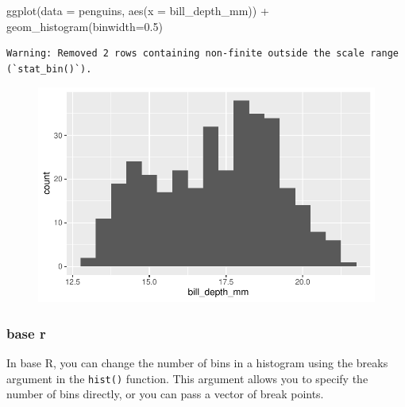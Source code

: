 \documentclass[
  letterpaper,
  DIV=11,
  numbers=noendperiod]{scrreprt}
\newenvironment{Shaded}{\begin{snugshade}}{\end{snugshade}}
\newcommand{\AttributeTok}[1]{\textcolor[rgb]{0.40,0.45,0.13}{#1}}
\newcommand{\FloatTok}[1]{\textcolor[rgb]{0.68,0.00,0.00}{#1}}
\newcommand{\FunctionTok}[1]{\textcolor[rgb]{0.28,0.35,0.67}{#1}}
\newcommand{\NormalTok}[1]{\textcolor[rgb]{0.00,0.23,0.31}{#1}}
\newcommand{\SpecialCharTok}[1]{\textcolor[rgb]{0.37,0.37,0.37}{#1}}
\begin{document}
\begin{tcolorbox}
\begin{figure}[H]
{}

\end{figure}

\begin{Shaded}
\begin{Highlighting}[]
\FunctionTok{ggplot}\NormalTok{(}\AttributeTok{data =}\NormalTok{ penguins, }\FunctionTok{aes}\NormalTok{(}\AttributeTok{x =}\NormalTok{ bill\_depth\_mm)) }\SpecialCharTok{+}
  \FunctionTok{geom\_histogram}\NormalTok{(}\AttributeTok{binwidth=}\FloatTok{0.5}\NormalTok{) }
\end{Highlighting}
\end{Shaded}

\begin{verbatim}
Warning: Removed 2 rows containing non-finite outside the scale range
(`stat_bin()`).
\end{verbatim}

\begin{figure}[H]

{\centering \includegraphics{scripts/02_dataViz/class4_files/figure-pdf/widths2-2.pdf}

}

\end{figure}

\hypertarget{base-r-8}{%
\subsubsection{base r}\label{base-r-8}}

In base R, you can change the number of bins in a histogram using the
breaks argument in the \texttt{hist()} function. This argument allows
you to specify the number of bins directly, or you can pass a vector of
break points.


\end{tcolorbox}
\end{document}
